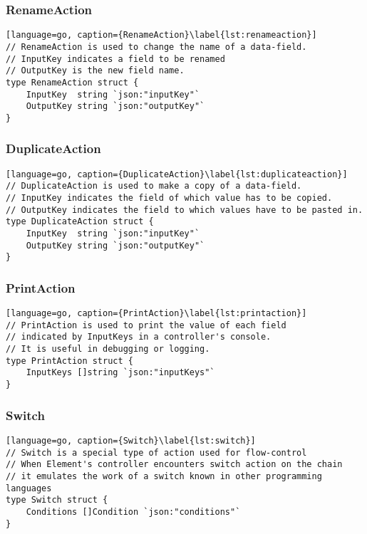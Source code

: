 \subsubsection{RenameAction}
\begin{lstlisting}[language=go, caption={RenameAction}\label{lst:renameaction}]
// RenameAction is used to change the name of a data-field.
// InputKey indicates a field to be renamed
// OutputKey is the new field name.
type RenameAction struct {
	InputKey  string `json:"inputKey"`
	OutputKey string `json:"outputKey"`
}
\end{lstlisting}

\subsubsection{DuplicateAction}
\begin{lstlisting}[language=go, caption={DuplicateAction}\label{lst:duplicateaction}]
// DuplicateAction is used to make a copy of a data-field.
// InputKey indicates the field of which value has to be copied.
// OutputKey indicates the field to which values have to be pasted in.
type DuplicateAction struct {
	InputKey  string `json:"inputKey"`
	OutputKey string `json:"outputKey"`
}
\end{lstlisting}

\subsubsection{PrintAction}
\begin{lstlisting}[language=go, caption={PrintAction}\label{lst:printaction}]
// PrintAction is used to print the value of each field 
// indicated by InputKeys in a controller's console.
// It is useful in debugging or logging.
type PrintAction struct {
	InputKeys []string `json:"inputKeys"`
}
\end{lstlisting}

\subsubsection{Switch}
\begin{lstlisting}[language=go, caption={Switch}\label{lst:switch}]
// Switch is a special type of action used for flow-control
// When Element's controller encounters switch action on the chain
// it emulates the work of a switch known in other programming languages
type Switch struct {
	Conditions []Condition `json:"conditions"`
}
\end{lstlisting}

